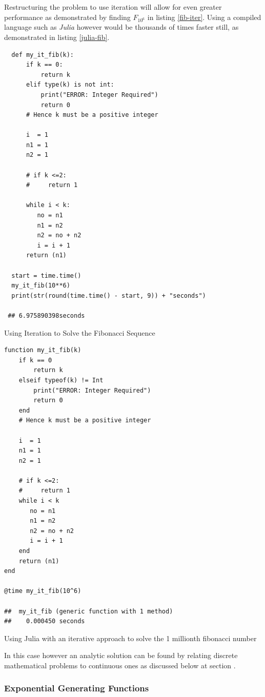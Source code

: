 \documentclass[11pt]{article}
\begin{document}
Restructuring the problem to use iteration will allow for even greater performance as demonstrated by finding \(F_{10^{6}}\) in listing \ref{fib-iter}. Using a compiled language such as \emph{Julia} however would be thousands of times faster still, as demonstrated in listing \ref{julia-fib}.



\begin{listing}[htbp]
\begin{verbatim}
  def my_it_fib(k):
      if k == 0:
          return k
      elif type(k) is not int:
          print("ERROR: Integer Required")
          return 0
      # Hence k must be a positive integer

      i  = 1
      n1 = 1
      n2 = 1

      # if k <=2:
      #     return 1

      while i < k:
         no = n1
         n1 = n2
         n2 = no + n2
         i = i + 1
      return (n1)

  start = time.time()
  my_it_fib(10**6)
  print(str(round(time.time() - start, 9)) + "seconds")

 ## 6.975890398seconds
\end{verbatim}
\caption{\label{fib-iter}Using Iteration to Solve the Fibonacci Sequence}
\end{listing}

\begin{listing}[htbp]
\begin{verbatim}
function my_it_fib(k)
    if k == 0
        return k
    elseif typeof(k) != Int
        print("ERROR: Integer Required")
        return 0
    end
    # Hence k must be a positive integer

    i  = 1
    n1 = 1
    n2 = 1

    # if k <=2:
    #     return 1
    while i < k
       no = n1
       n1 = n2
       n2 = no + n2
       i = i + 1
    end
    return (n1)
end

@time my_it_fib(10^6)

##  my_it_fib (generic function with 1 method)
##    0.000450 seconds
\end{verbatim}
\caption{\label{julia-fib}Using Julia with an iterative approach to solve the 1 millionth fibonacci number}
\end{listing}

In this case however an analytic solution can be found by relating discrete
mathematical problems to continuous ones as discussed below at section .
\subsubsection{Exponential Generating Functions}
\label{exp-gen-func-fib-seq}
\end{document}
